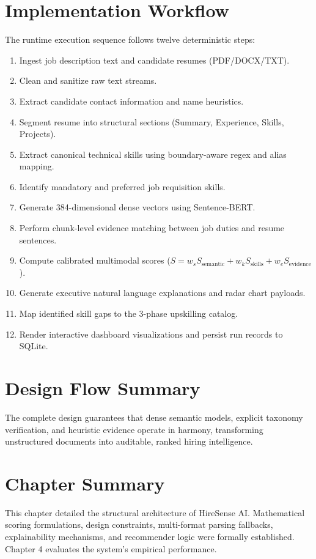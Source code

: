 \documentclass[12pt,a4paper]{report}
\begin{document}
\section{Implementation Workflow}
The runtime execution sequence follows twelve deterministic steps:
\begin{enumerate}
    \item Ingest job description text and candidate resumes (PDF/DOCX/TXT).
    \item Clean and sanitize raw text streams.
    \item Extract candidate contact information and name heuristics.
    \item Segment resume into structural sections (Summary, Experience, Skills, Projects).
    \item Extract canonical technical skills using boundary-aware regex and alias mapping.
    \item Identify mandatory and preferred job requisition skills.
    \item Generate 384-dimensional dense vectors using Sentence-BERT.
    \item Perform chunk-level evidence matching between job duties and resume sentences.
    \item Compute calibrated multimodal scores ($S = w_s S_{\text{semantic}} + w_k S_{\text{skills}} + w_e S_{\text{evidence}}$).
    \item Generate executive natural language explanations and radar chart payloads.
    \item Map identified skill gaps to the 3-phase upskilling catalog.
    \item Render interactive dashboard visualizations and persist run records to SQLite.
\end{enumerate}

\section{Design Flow Summary}
The complete design guarantees that dense semantic models, explicit taxonomy verification, and heuristic evidence operate in harmony, transforming unstructured documents into auditable, ranked hiring intelligence.

\section{Chapter Summary}
This chapter detailed the structural architecture of HireSense AI. Mathematical scoring formulations, design constraints, multi-format parsing fallbacks, explainability mechanisms, and recommender logic were formally established. Chapter 4 evaluates the system's empirical performance.
\end{document}
